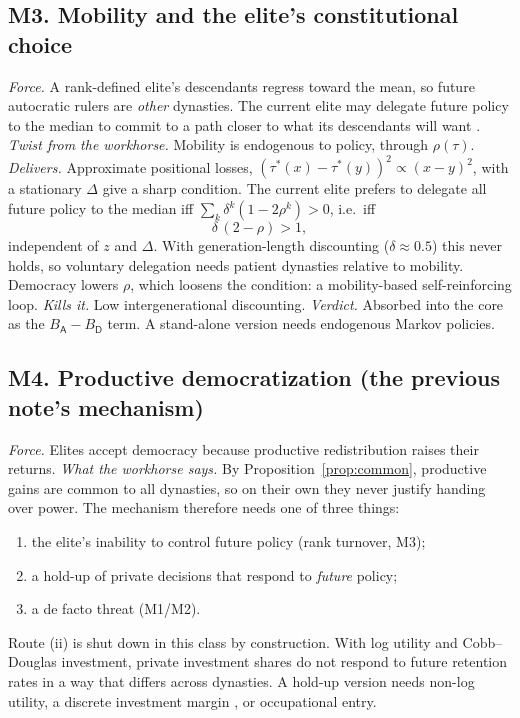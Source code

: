 \documentclass[11pt]{article}
\theoremstyle{remark}
\newcommand{\A}{\mathsf{A}}
\newcommand{\D}{\mathsf{D}}
\begin{document}
\subsection{M3. Mobility and the elite's constitutional choice}
\emph{Force.}  A rank-defined elite's descendants regress toward the mean, so future autocratic rulers are \emph{other} dynasties.  The current elite may delegate future policy to the median to commit to a path closer to what its descendants will want \citep{JackLagunoff2006,Leventoglu2014,AcemogluEgorovSonin2018}.  \emph{Twist from the workhorse.}  Mobility is endogenous to policy, through $\rho(\tau)$.  \emph{Delivers.}  Approximate positional losses, $(\tau^*(x)-\tau^*(y))^2\propto(x-y)^2$, with a stationary $\Delta$ give a sharp condition.  The current elite prefers to delegate all future policy to the median iff $\sum_k\delta^k(1-2\rho^k)>0$, i.e.\ iff
\[
\delta\,(2-\rho)>1,
\]
independent of $z$ and $\Delta$.  With generation-length discounting ($\delta\approx0.5$) this never holds, so voluntary delegation needs patient dynasties relative to mobility.  Democracy lowers $\rho$, which loosens the condition: a mobility-based self-reinforcing loop.  \emph{Kills it.}  Low intergenerational discounting.  \emph{Verdict.}  Absorbed into the core as the $B_\A-B_\D$ term.  A stand-alone version needs endogenous Markov policies.

\subsection{M4. Productive democratization (the previous note's mechanism)}\label{sec:productive}
\emph{Force.}  Elites accept democracy because productive redistribution raises their returns.  \emph{What the workhorse says.}  By Proposition~\ref{prop:common}, productive gains are common to all dynasties, so on their own they never justify handing over power.  The mechanism therefore needs one of three things:
\begin{enumerate}[label=(\roman*)]
\item the elite's inability to control future policy (rank turnover, M3);
\item a hold-up of private decisions that respond to \emph{future} policy;
\item a de facto threat (M1/M2).
\end{enumerate}
Route (ii) is shut down in this class by construction.  With log utility and Cobb--Douglas investment, private investment shares do not respond to future retention rates in a way that differs across dynasties.  A hold-up version needs non-log utility, a discrete investment margin \citep[as in][]{GalorZeira1993}, or occupational entry.
\end{document}

